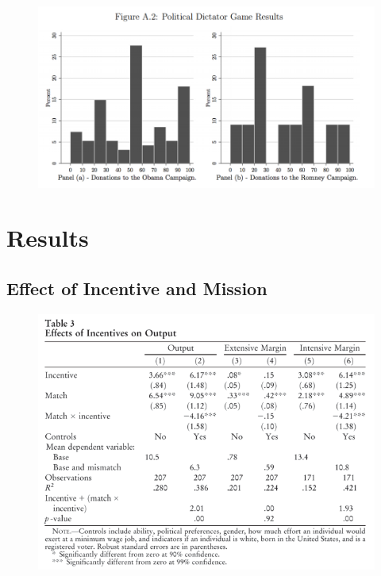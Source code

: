 \documentclass[../root]{subfiles}
\begin{document}
    \begin{figure}[h]
        \centering
        \includegraphics[width = 1.0\linewidth]{os0602kato/intensity_result.PNG}
        \label{Result: Intensity}
    \end{figure}


    \section{Results}

    \subsection{Effect of Incentive and Mission}

    \begin{figure}[h]
        \centering
        \includegraphics[width = 0.8\linewidth]{os0602kato/reg1.PNG}
        \label{Result: Regression 1}
    \end{figure}
\end{document}
